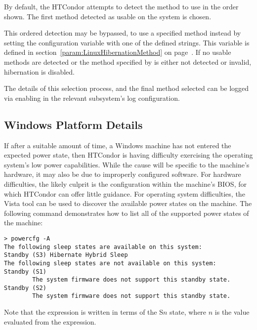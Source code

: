 By default, the HTCondor attempts to detect the method
to use in the order shown.  The first method detected as usable
on the system is chosen.

This ordered detection may be bypassed,
to use a specified method instead by setting the configuration
variable  with
one of the defined strings.
This variable is defined in 
section~\ref{param:LinuxHibernationMethod} on
page~\pageref{param:LinuxHibernationMethod}.
If no usable methods are detected or the method specified by
 is either not detected or invalid,
hibernation is disabled.

The details of this selection process, and the final method selected
can be logged via enabling  in the relevant
subsystem's log configuration.


\subsection{Windows Platform Details}

If after a suitable amount of time,
a Windows machine has not entered the expected power state,
then HTCondor is having difficulty exercising the operating system's
low power capabilities.  
While the cause will be specific to the machine's hardware,
it may also be due to improperly configured software.  
For hardware difficulties,
the likely culprit is the configuration within the machine's BIOS,
for which HTCondor can offer little guidance.
For operating system difficulties,
the Vista  tool can be used to discover the available 
power states on the machine.
The following command demonstrates how to
list all of the supported power states of the machine:

\begin{verbatim}
> powercfg -A
The following sleep states are available on this system: 
Standby (S3) Hibernate Hybrid Sleep
The following sleep states are not available on this system:
Standby (S1)
        The system firmware does not support this standby state.
Standby (S2)
        The system firmware does not support this standby state.
\end{verbatim}

Note that the  expression is written in terms of the 
S$n$ state, where $n$ is the value evaluated from the expression.

